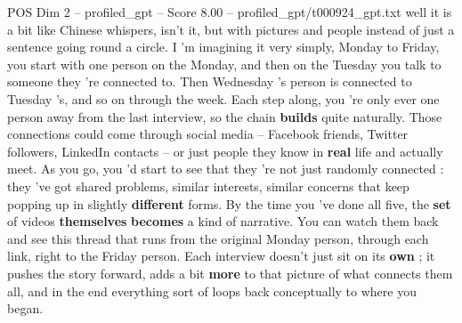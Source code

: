\begin{textsample}{POS Dim 2 – profiled\_gpt – Score 8.00 – profiled\_gpt/t000924\_gpt.txt}  \label{ex:f2_pos_004}
well it is a bit like Chinese whispers, isn't it, but with pictures and people instead of just a sentence going round a circle.
I ’m imagining it very simply, Monday to Friday, you start with one person on the Monday, and then on the Tuesday you talk to someone they ’re connected to.
Then Wednesday ’s person is connected to Tuesday ’s, and so on through the week.
Each step along, you ’re only ever one person away from the last interview, so the chain \textbf{builds} quite naturally.
Those connections could come through social media – Facebook friends, Twitter followers, LinkedIn contacts – or just people they know in \textbf{real} life and actually meet.
As you go, you ’d start to see that they ’re not just randomly connected : they ’ve got shared problems, similar interests, similar concerns that keep popping up in slightly \textbf{different} forms.
By the time you ’ve done all five, the \textbf{set} of videos \textbf{themselves} \textbf{becomes} a kind of narrative.
You can watch them back and see this thread that runs from the original Monday person, through each link, right to the Friday person.
Each interview doesn't just sit on its \textbf{own} ; it pushes the story forward, adds a bit \textbf{more} to that picture of what connects them all, and in the end everything sort of loops back conceptually to where you began.

\end{textsample}
